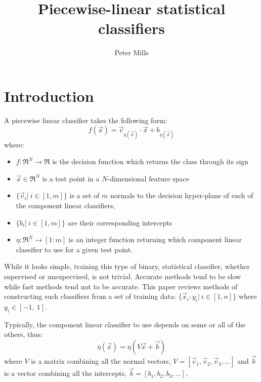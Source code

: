\documentclass{article}
\newcommand{\decision}{f}
\newcommand{\testpoint}{\vec x}
\newcommand{\domainfunction}{\eta}
\newcommand{\normal}{v}
\newcommand{\constant}{b}
\newcommand{\dimension}{N}
\newcommand{\ndomain}{m}
\newcommand{\sample}{x}
\newcommand{\ord}{y}
\newcommand{\ntrain}{n}
\newcommand{\normals}{V}
\begin{document}
\title{Piecewise-linear statistical classifiers}

\author{Peter Mills}

\maketitle

\section{Introduction}

A piecewise linear classifier takes the following form:
\begin{equation}
\decision(\testpoint) = \vec \normal_{\domainfunction(\testpoint)} \cdot \testpoint + \constant_{\domainfunction(\testpoint)}
\end{equation}
where:
\begin{itemize}
  \item $\decision:\Re^\dimension \rightarrow \Re$ is the decision function which returns the class through its sign
  \item $\testpoint \in \Re^\dimension$ is a test point in a 
	  $\dimension$-dimensional feature space
  \item $\lbrace \vec \normal_i|~ i \in [1,\ndomain] \rbrace$ is a set of $\ndomain$
	  normals to the decision hyper-plane of each of the 
	  component linear classifiers,
  \item $\lbrace \constant_i|~ i \in [1,\ndomain] \rbrace$ are their corresponding intercepts
  \item $\domainfunction:\Re^\dimension \rightarrow [1:\ndomain]$ is an integer
function returning which component linear classifier to use for a given
test point.
\end{itemize}

While it looks simple, training this type of binary, 
statistical classifier, whether supervised or unsupervised, is not trivial.
Accurate methods tend to be slow while fast methods tend not to be accurate.
This paper reviews methods of constructing such classifiers from a set of 
training data: $\lbrace \vec \sample_i : \ord_i|~ i \in [1, \ntrain] \rbrace$
where $\ord_i \in [-1,~ 1]$.

Typically, the component linear classifier to use depends on some or all of
the others, thus:
\begin{equation}
	\domainfunction(\testpoint) = \domainfunction(\normals \testpoint + \vec \constant)
\end{equation}
where $\normals$ is a matrix combining all the normal vectors,
$\normals=[ \vec \normal_1, \vec \normal_2, \vec \normal_3, ... ]$ and 
$\vec \constant$ is a vector combining all the intercepts,
$\vec \constant= [ \constant_1, \constant_2, \constant_3,... ]$.
\end{document}
